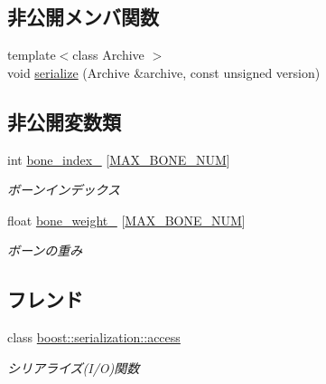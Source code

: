 \subsection*{非公開メンバ関数}
\begin{DoxyCompactItemize}
\item 
{\footnotesize template$<$class Archive $>$ }\\void \mbox{\hyperlink{class_md_bin_data_1_1_mesh_1_1_bone_weight_a2ffaf506ea648dc122ff380eb9f81010}{serialize}} (Archive \&archive, const unsigned version)
\end{DoxyCompactItemize}
\subsection*{非公開変数類}
\begin{DoxyCompactItemize}
\item 
int \mbox{\hyperlink{class_md_bin_data_1_1_mesh_1_1_bone_weight_acfd3a3787786ddce83e1360d4c66dc4e}{bone\+\_\+index\+\_\+}} \mbox{[}\mbox{\hyperlink{class_md_bin_data_1_1_mesh_1_1_bone_weight_a2c870f6c96315b6b9630cff3c24b79e7}{M\+A\+X\+\_\+\+B\+O\+N\+E\+\_\+\+N\+UM}}\mbox{]}
\begin{DoxyCompactList}\small\item\em ボーンインデックス \end{DoxyCompactList}\item 
float \mbox{\hyperlink{class_md_bin_data_1_1_mesh_1_1_bone_weight_a0122907a7aa6c928e0a14e6e577e4b80}{bone\+\_\+weight\+\_\+}} \mbox{[}\mbox{\hyperlink{class_md_bin_data_1_1_mesh_1_1_bone_weight_a2c870f6c96315b6b9630cff3c24b79e7}{M\+A\+X\+\_\+\+B\+O\+N\+E\+\_\+\+N\+UM}}\mbox{]}
\begin{DoxyCompactList}\small\item\em ボーンの重み \end{DoxyCompactList}\end{DoxyCompactItemize}
\subsection*{フレンド}
\begin{DoxyCompactItemize}
\item 
class \mbox{\hyperlink{class_md_bin_data_1_1_mesh_1_1_bone_weight_ac98d07dd8f7b70e16ccb9a01abf56b9c}{boost\+::serialization\+::access}}
\begin{DoxyCompactList}\small\item\em シリアライズ(I/O)関数 \end{DoxyCompactList}\end{DoxyCompactItemize}



